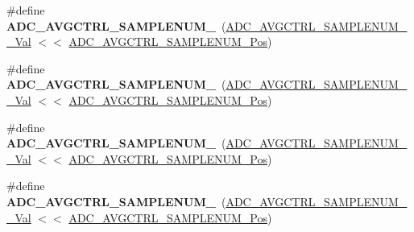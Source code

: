 \begin{DoxyCompactItemize}
\item 
\hypertarget{group___s_a_m_l21___a_d_c_ga12811d2809b0cf3a478e90c5cc6e35f3}{}\#define {\bfseries A\+D\+C\+\_\+\+A\+V\+G\+C\+T\+R\+L\+\_\+\+S\+A\+M\+P\+L\+E\+N\+U\+M\+\_}~(\hyperlink{group___s_a_m_l21___a_d_c_gaccc8c475aeda72ace654784ec4586bf3}{A\+D\+C\+\_\+\+A\+V\+G\+C\+T\+R\+L\+\_\+\+S\+A\+M\+P\+L\+E\+N\+U\+M\+\_\+\_\+\+Val}   $<$$<$ \hyperlink{group___s_a_m_l21___a_d_c_gae24ef894295278762f9293105f06ffb9}{A\+D\+C\+\_\+\+A\+V\+G\+C\+T\+R\+L\+\_\+\+S\+A\+M\+P\+L\+E\+N\+U\+M\+\_\+\+Pos})\label{group___s_a_m_l21___a_d_c_ga12811d2809b0cf3a478e90c5cc6e35f3}

\item 
\hypertarget{group___s_a_m_l21___a_d_c_gac7d168ffa0342efe267c78be07914559}{}\#define {\bfseries A\+D\+C\+\_\+\+A\+V\+G\+C\+T\+R\+L\+\_\+\+S\+A\+M\+P\+L\+E\+N\+U\+M\+\_}~(\hyperlink{group___s_a_m_l21___a_d_c_ga5edfb4fb05fa1c6854f3bf7e1be6f325}{A\+D\+C\+\_\+\+A\+V\+G\+C\+T\+R\+L\+\_\+\+S\+A\+M\+P\+L\+E\+N\+U\+M\+\_\+\_\+\+Val}  $<$$<$ \hyperlink{group___s_a_m_l21___a_d_c_gae24ef894295278762f9293105f06ffb9}{A\+D\+C\+\_\+\+A\+V\+G\+C\+T\+R\+L\+\_\+\+S\+A\+M\+P\+L\+E\+N\+U\+M\+\_\+\+Pos})\label{group___s_a_m_l21___a_d_c_gac7d168ffa0342efe267c78be07914559}

\item 
\hypertarget{group___s_a_m_l21___a_d_c_ga62f0383bab27aa08277a7cbdec27e78e}{}\#define {\bfseries A\+D\+C\+\_\+\+A\+V\+G\+C\+T\+R\+L\+\_\+\+S\+A\+M\+P\+L\+E\+N\+U\+M\+\_}~(\hyperlink{group___s_a_m_l21___a_d_c_gac9caa4b313c212c56aa881082f2e37c9}{A\+D\+C\+\_\+\+A\+V\+G\+C\+T\+R\+L\+\_\+\+S\+A\+M\+P\+L\+E\+N\+U\+M\+\_\+\_\+\+Val}  $<$$<$ \hyperlink{group___s_a_m_l21___a_d_c_gae24ef894295278762f9293105f06ffb9}{A\+D\+C\+\_\+\+A\+V\+G\+C\+T\+R\+L\+\_\+\+S\+A\+M\+P\+L\+E\+N\+U\+M\+\_\+\+Pos})\label{group___s_a_m_l21___a_d_c_ga62f0383bab27aa08277a7cbdec27e78e}

\item 
\hypertarget{group___s_a_m_l21___a_d_c_ga436c2afe4836fa1623bccb1fc07d423b}{}\#define {\bfseries A\+D\+C\+\_\+\+A\+V\+G\+C\+T\+R\+L\+\_\+\+S\+A\+M\+P\+L\+E\+N\+U\+M\+\_}~(\hyperlink{group___s_a_m_l21___a_d_c_gaa681a5f11f5f2c7147f8471caa9a1789}{A\+D\+C\+\_\+\+A\+V\+G\+C\+T\+R\+L\+\_\+\+S\+A\+M\+P\+L\+E\+N\+U\+M\+\_\+\_\+\+Val}  $<$$<$ \hyperlink{group___s_a_m_l21___a_d_c_gae24ef894295278762f9293105f06ffb9}{A\+D\+C\+\_\+\+A\+V\+G\+C\+T\+R\+L\+\_\+\+S\+A\+M\+P\+L\+E\+N\+U\+M\+\_\+\+Pos})\label{group___s_a_m_l21___a_d_c_ga436c2afe4836fa1623bccb1fc07d423b}


\end{DoxyCompactItemize}
